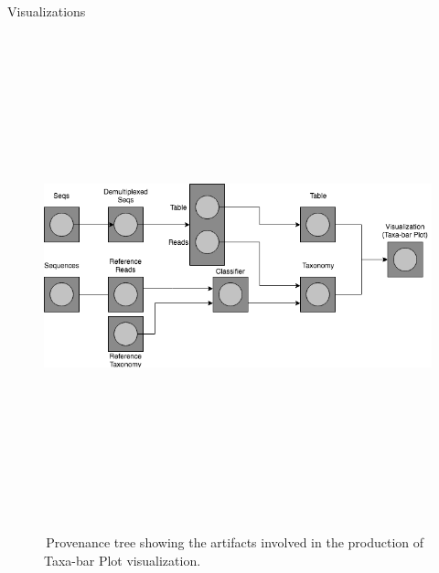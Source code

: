 \documentclass[final]{beamer}
\newlength{\colwidth}
\begin{document}
\begin{frame}[t]
\begin{columns}[t]
\begin{column}{\colwidth}
  \begin{block}{Visualizations}
    \begin{figure}[tph!]
      {\includegraphics[height=14cm]{assets/provenance}}
      \caption{\,Provenance tree showing the artifacts involved in the production of Taxa-bar Plot visualization.}
      \label{fig:provenance}
    \end{figure}


\end{block}
\end{column}
\end{columns}
\end{frame}
\end{document}

